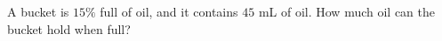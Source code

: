 A bucket is $15\%$ full of oil, and it contains $45$ mL of oil. How much oil can the bucket hold when full?
